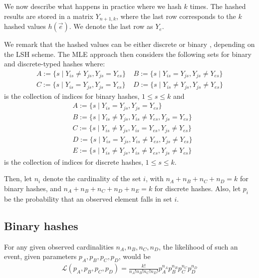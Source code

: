 \documentclass[runningheads]{llncs}
\begin{document}
We now describe what happens in practice where we hash $k$ times. The hashed results are stored in a matrix $Y_{n+1, k}$, where the last row corresponds to the $k$ hashed values $h(\vec{e})$. We denote the last row as $Y_{e}$. 

We remark that the hashed values can be either discrete \cite{broder1997resemblance} or binary \cite{charikar2002similarity}, depending on the LSH scheme. The MLE approach \cite{kang2018improving} then considers the following sets for binary and discrete-typed hashes where:
\begin{align}
A := \{s \mid Y_{is} \neq Y_{js}, Y_{js} = Y_{es}\} ~~~~~ B := \{s \mid Y_{is} = Y_{js}, Y_{js} \neq Y_{es}\} \\
C := \{s \mid Y_{is} = Y_{js}, Y_{js} = Y_{es}\} ~~~~~ D := \{s \mid Y_{is} \neq Y_{js}, Y_{js} \neq Y_{es}\}
\end{align}
        is the collection of indices for binary hashes, $1 \leq s \leq k$ and
        \begin{align}
            &A := \{s \mid Y_{is} = Y_{js}, Y_{js} = Y_{es}\} \\
            &B := \{s \mid Y_{is} \neq Y_{js}, Y_{is} \neq Y_{es}, Y_{js} = Y_{es}\} \\
            &C := \{s \mid Y_{is} \neq Y_{js}, Y_{is} = Y_{es}, Y_{js} \neq Y_{es}\} \\
            &D := \{s \mid Y_{is} = Y_{js}, Y_{is} \neq Y_{es}, Y_{js} \neq Y_{es}\} \\
            &E := \{s \mid Y_{is} \neq Y_{js}, Y_{is} \neq Y_{es}, Y_{js} \neq Y_{es}\}
        \end{align}
        is the collection of indices for discrete hashes, $1 \leq s \leq k$.
        
        Then, let $n_i$ denote the cardinality of the set $i$, with $n_A + n_B + n_C + n_D = k$ for binary hashes, and $n_A + n_B + n_C + n_D + n_E = k$ for discrete hashes. Also, let $p_i$ be the probability that an observed element falls in set $i$.
        
       \subsection{Binary hashes}
        For any given observed cardinalities $n_A, n_B, n_C, n_D$, the likelihood of such an event, given parameters $p_A, p_B, p_C, p_D$, would be
\begin{align}
        \mathcal{L}(p_A, p_B, p_C, p_D) = \frac{k!}{n_A!n_B!n_C!n_D!} p_A^{n_A} p_B^{n_B} p_C^{n_C} p_D^{n_D}
\end{align}
        
\end{document}
